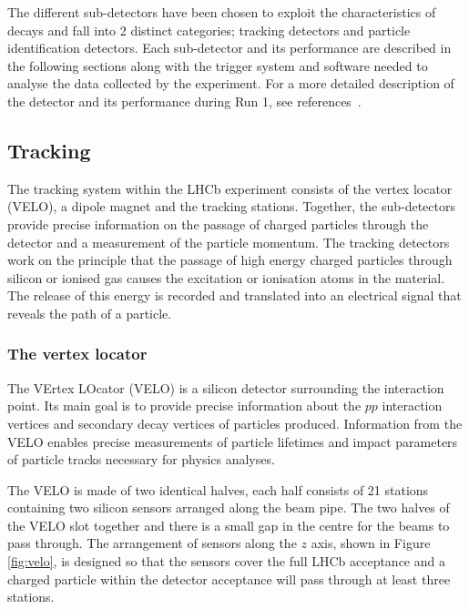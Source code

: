 The different sub-detectors have been chosen to exploit the characteristics of \bhadron decays and fall into 2 distinct categories; tracking detectors and particle identification detectors. Each sub-detector and its performance are described in the following sections along with the trigger system and software needed to analyse the data collected by the experiment. %
For a more detailed description of the detector and its performance during Run 1, see references~\cite{LHCb:2003ab,Aaij:2014jba}.




\subsection{Tracking}
\label{Tracking}

The tracking system within the LHCb experiment consists of the vertex locator (VELO), a dipole magnet and the tracking stations. Together, the sub-detectors provide precise information on the passage of charged particles through the detector and a measurement of the particle momentum. 
The tracking detectors work on the principle that the passage of high energy charged particles through silicon or ionised gas causes the excitation or ionisation atoms in the material. The release of this energy is recorded and translated into an electrical signal that reveals the path of a particle. 

\subsubsection{The vertex locator}
\label{VELO}
The VErtex LOcator (VELO) is a silicon detector surrounding the interaction point. Its main goal is to provide precise information about the $pp$ interaction vertices and secondary decay vertices of particles produced. Information from the VELO enables precise measurements of particle lifetimes and impact parameters of particle tracks necessary for physics analyses.


The VELO is made of two identical halves, each half consists of 21 stations containing two silicon sensors arranged along the beam pipe. The two halves of the VELO slot together and there is a small gap in the centre for the beams to pass through. The arrangement of sensors along the $z$ axis, shown in Figure \ref{fig:velo}, is designed so that the sensors cover the full LHCb acceptance and a charged particle within the detector acceptance will pass through at least three stations. 

